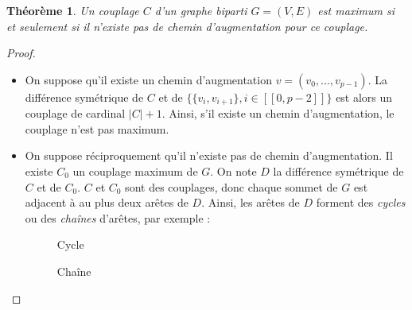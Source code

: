 \documentclass[11pt,a4paper]{article}
\newtheorem*{theorem}{Théorème} %
\begin{document}
\begin{theorem}
  Un couplage \(C\) d'un graphe biparti \(G=(V,E)\) est maximum si et seulement si il n'existe pas de chemin d'augmentation pour ce couplage.
\end{theorem}
\begin{proof}\leavevmode
  \begin{itemize}
    \item On suppose qu'il existe un chemin d'augmentation \(v = (v_0, ..., v_{p-1})\). La différence symétrique de \(C\) et de \(\{ \{v_i,v_{i+1}\}, i \in [\![0,p-2]\!] \}\) est alors un couplage de cardinal \(|C|+1\). Ainsi, s'il existe un chemin d'augmentation, le couplage n'est pas maximum.

    \item
      On suppose réciproquement qu'il n'existe pas de chemin d'augmentation. Il existe \(C_0\) un couplage maximum de \(G\). On note \(D\) la différence symétrique de \(C\) et de \(C_0\). \(C\) et \(C_0\) sont des couplages, donc chaque sommet de \(G\) est adjacent à au plus deux arêtes de \(D\). Ainsi, les arêtes de \(D\) forment des \textit{cycles} ou des \textit{chaînes} d'arêtes, par exemple :

      \begin{figure}[ht]
        \centering
        \begin{minipage}{.5\textwidth}
          \centering
          \caption{Cycle}
          \vspace{2mm}
        \end{minipage}%
        \begin{minipage}{.5\textwidth}
          \centering
          \caption{Chaîne}
          \vspace{2mm}
        \end{minipage}
      \end{figure}


\end{itemize}
\end{proof}
\end{document}
